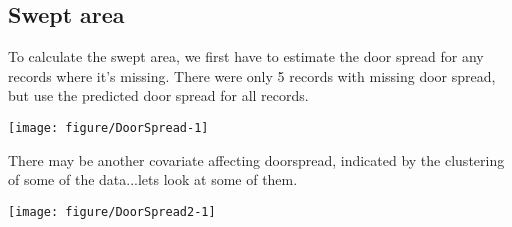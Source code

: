 \documentclass[12pt]{article}\usepackage[]{graphicx}\usepackage[]{color}
\makeatletter
\def\maxwidth{ %
  \ifdim\Gin@nat@width>\linewidth
    \linewidth
  \else
    \Gin@nat@width
  \fi
}
\newenvironment{kframe}{%
 \def\at@end@of@kframe{}%
 \ifinner\ifhmode%
  \def\at@end@of@kframe{\end{minipage}}%
  \begin{minipage}{\columnwidth}%
 \fi\fi%
 \def\FrameCommand##1{\hskip\@totalleftmargin \hskip-\fboxsep
 \colorbox{shadecolor}{##1}\hskip-\fboxsep
     \hskip-\linewidth \hskip-\@totalleftmargin \hskip\columnwidth}%
 \MakeFramed {\advance\hsize-\width
   \@totalleftmargin\z@ \linewidth\hsize
   \@setminipage}}%
 {\par\unskip\endMakeFramed%
 \at@end@of@kframe}
\newenvironment{knitrout}{}{} %
\makeatother
\begin{document}
\subsection{Swept area}

To calculate the swept area, we first have to estimate the door spread for any
records where it's missing. There were only 5 records with missing door spread,
but use the predicted door spread for all records. \\

\begin{knitrout}\footnotesize
{}\color{fgcolor}\begin{kframe}


{\ttfamily\noindent\color{warningcolor}{\#\# Warning: Removed 955 rows containing missing values (geom\_point).}}\end{kframe}

{\centering \texttt{[image: figure/DoorSpread-1]} 

}



\end{knitrout}

There may be another covariate affecting doorspread, indicated by the
clustering of some of the data...lets look at some of them.

\begin{knitrout}\footnotesize
{}\color{fgcolor}\begin{kframe}


{\ttfamily\noindent\color{warningcolor}{\#\# Warning: Removed 955 rows containing missing values (geom\_point).}}

{\ttfamily\noindent\color{warningcolor}{\#\# Warning: Removed 955 rows containing missing values (geom\_point).}}

{\ttfamily\noindent\color{warningcolor}{\#\# Warning: Removed 955 rows containing missing values (geom\_point).}}

{\ttfamily\noindent\color{warningcolor}{\#\# Warning: Removed 955 rows containing missing values (geom\_point).}}\end{kframe}

{\centering \texttt{[image: figure/DoorSpread2-1]} 

}



\end{knitrout}
\end{document}
